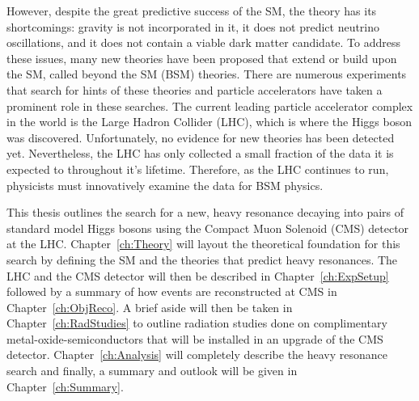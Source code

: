 However, despite the great predictive success of the SM, the theory has its shortcomings: gravity is not incorporated in it, it does not predict neutrino oscillations, and it does not contain a viable dark matter candidate. To address these issues, many new theories have been proposed that extend or build upon the SM, called beyond the SM (BSM) theories. There are numerous experiments that search for hints of these theories and particle accelerators have taken a prominent role in these searches. The current leading particle accelerator complex in the world is the Large Hadron Collider (LHC), which is where the Higgs boson was discovered. Unfortunately, no evidence for new theories has been detected yet. Nevertheless, the LHC has only collected a small fraction of the data it is expected to throughout it’s lifetime. Therefore, as the LHC continues to run, physicists must innovatively examine the data for BSM physics.

This thesis outlines the search for a new, heavy resonance decaying into pairs of standard model Higgs bosons using the Compact Muon Solenoid (CMS) detector at the LHC. Chapter~\ref{ch:Theory} will layout the theoretical foundation for this search by defining the SM and the theories that predict heavy resonances. The LHC and the CMS detector will then be described in Chapter~\ref{ch:ExpSetup} followed by a summary of how events are reconstructed at CMS in Chapter~\ref{ch:ObjReco}. A brief aside will then be taken in Chapter~\ref{ch:RadStudies} to outline radiation studies done on complimentary metal-oxide-semiconductors that will be installed in an upgrade of the CMS detector. Chapter~\ref{ch:Analysis} will completely describe the heavy resonance search and finally, a summary and outlook will be given in Chapter~\ref{ch:Summary}.
